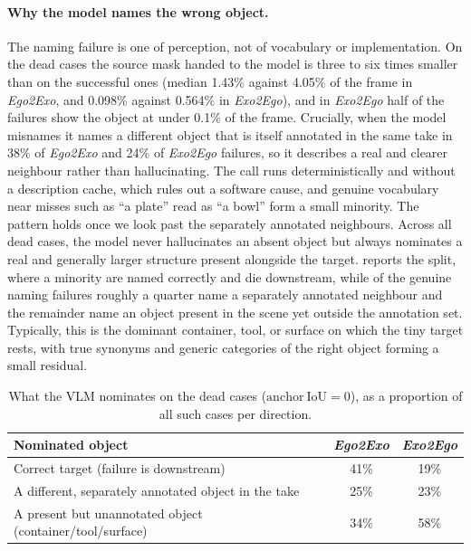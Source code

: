 \paragraph{Why the model names the wrong object.}
\label{subsec:Stage2-deepdive}

The naming failure is one of perception, not of vocabulary or implementation. On the dead cases the source mask handed to the model is three to six times smaller than on the successful ones (median 1.43\% against 4.05\% of the frame in \textit{Ego2Exo}, and 0.098\% against 0.564\% in \textit{Exo2Ego}), and in \textit{Exo2Ego} half of the failures show the object at under 0.1\% of the frame. Crucially, when the model misnames it names a different object that is itself annotated in the same take in 38\% of \textit{Ego2Exo} and 24\% of \textit{Exo2Ego} failures, so it describes a real and clearer neighbour rather than hallucinating. The call runs deterministically and without a description cache, which rules out a software cause, and genuine vocabulary near misses such as ``a plate'' read as ``a bowl'' form a small minority. The pattern holds once we look past the separately annotated neighbours. Across all dead cases, the model never hallucinates an absent object but always nominates a real and generally larger structure present alongside the target.  reports the split, where a minority are named correctly and die downstream, while of the genuine naming failures roughly a quarter name a separately annotated neighbour and the remainder name an object present in the scene yet outside the annotation set. Typically, this is the dominant container, tool, or surface on which the tiny target rests, with true synonyms and generic categories of the right object forming a small residual.

\begin{table}[t]
\centering
\caption{What the VLM nominates on the dead cases ($\mathrm{anchor\ IoU}=0$), as a proportion of all such cases per direction.}
\label{tab:wrong-nomination}
\begin{tabular}{lcc}
\toprule
Nominated object & \textit{Ego2Exo} & \textit{Exo2Ego} \\
\midrule
Correct target (failure is downstream) & 41\% & 19\% \\
A different, separately annotated object in the take & 25\% & 23\% \\
A present but unannotated object (container/tool/surface) & 34\% & 58\% \\
\bottomrule
\end{tabular}
\end{table}

